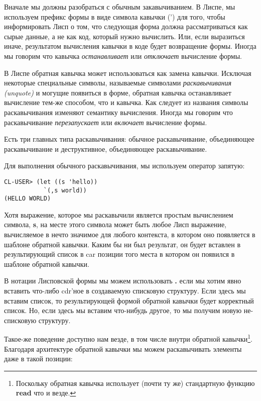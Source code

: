 Вначале мы должны разобраться с обычным закавычиванием. В Лиспе, мы используем префикс формы в виде символа кавычки (') для того, чтобы информировать Лисп о том, что следующая форма должна рассматриваться как сырые данные, а не как код, который нужно вычислить. Или, если выразиться иначе, результатом вычисления кавычки в коде будет возвращение формы. Иногда мы говорим что кавычка \emph{останавливает} или \emph{отключает} вычисление формы.

В Лиспе обратная кавычка может использоваться как замена кавычки. Исключая некоторые специальные символы, называемые символами \emph{раскавычивания (unquote)} и могущие появиться в форме, обратная кавычка останавливает вычисление тем-же способом, что и кавычка. Как следует из названия символы раскавычивания изменяют семантику вычисления. Иногда мы говорим что раскавычивание \emph{перезапускает} или \emph{включает} вычисление формы.

Есть три главных типа раскавычивания: обычное раскавычивание, объединяющее раскавычивание и деструктивное, объединяющее раскавычивание.

Для выполнения обычного раскавычивания, мы используем оператор запятую:

\begin{verbatim}
CL-USER> (let ((s 'hello))
           `(,s world))
(HELLO WORLD)
\end{verbatim}

Хотя выражение, которое мы раскавычили является простым вычислением символа, \textbf{s}, на месте этого символа может быть любое Лисп выражение, вычисляемое в нечто значимое для любого контекста, в котором оно появляется в шаблоне обратной кавычки. Каким бы ни был результат, он будет вставлен в результирующий список в car позиции того места в котором он появился в шаблоне обратной кавычки.

В нотации Лисповской формы мы можем использовать \textbf{.} если мы хотим явно вставить что-либо cdr'ное в создаваемую списковую структуру. Если здесь мы вставим список, то результирующей формой обратной кавычки будет корректный список. Но, если здесь мы вставим что-нибудь другое, то мы получим новую не-списковую структуру.

Такое-же поведение доступно нам везде, в том числе внутри обратной кавычки\footnote{Поскольку обратная кавычка использует (почти ту же) стандартную функцию \textbf{read} что и везде.}. Благодаря архитектуре обратной кавычки мы можем раскавычивать элементы даже в такой позиции:

